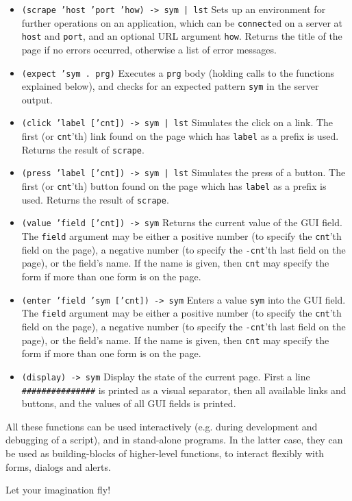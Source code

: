 \begin{itemize}
\item \texttt{(scrape 'host 'port 'how) -> sym | lst} Sets up an
  environment for further operations on an application, which can be
  \texttt{connect}ed on a server at \texttt{host} and \texttt{port},
  and an optional URL argument \texttt{how}. Returns the title of the
  page if no errors occurred, otherwise a list of error messages.

\item \texttt{(expect 'sym . prg)} Executes a \texttt{prg} body
  (holding calls to the functions explained below), and checks for an
  expected pattern \texttt{sym} in the server output.

\item \texttt{(click 'label ['cnt]) -> sym | lst} Simulates the click
  on a link. The first (or \texttt{cnt}'th) link found on the page
  which has \texttt{label} as a prefix is used. Returns the result of
  \texttt{scrape}.

\item \texttt{(press 'label ['cnt]) -> sym | lst} Simulates the press
  of a button. The first (or \texttt{cnt}'th) button found on the page
  which has \texttt{label} as a prefix is used. Returns the result of
  \texttt{scrape}.

\item \texttt{(value 'field ['cnt]) -> sym} Returns the current value
  of the GUI field. The \texttt{field} argument may be either a
  positive number (to specify the \texttt{cnt}'th field on the page),
  a negative number (to specify the \texttt{-cnt}'th last field on the
  page), or the field's name. If the name is given, then \texttt{cnt}
  may specify the form if more than one form is on the page.

\item \texttt{(enter 'field 'sym ['cnt]) -> sym} Enters a value
  \texttt{sym} into the GUI field. The \texttt{field} argument may be
  either a positive number (to specify the \texttt{cnt}'th field on
  the page), a negative number (to specify the \texttt{-cnt}'th last
  field on the page), or the field's name. If the name is given, then
  \texttt{cnt} may specify the form if more than one form is on the
  page.

\item \texttt{(display) -> sym} Display the state of the current page.
  First a line \texttt{\#\#\#\#\#\#\#\#\#\#\#\#\#\#\#} is printed as a visual
  separator, then all available links and buttons, and the values of
  all GUI fields is printed.

\end{itemize}

All these functions can be used interactively (e.g. during development
and debugging of a script), and in stand-alone programs. In the latter
case, they can be used as building-blocks of higher-level functions,
to interact flexibly with forms, dialogs and alerts.

Let your imagination fly!

